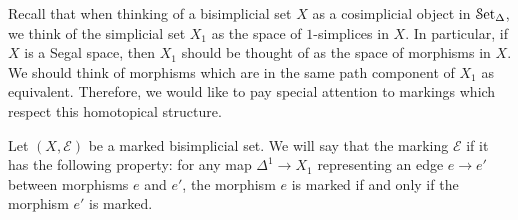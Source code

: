 \documentclass[main.tex]{subfiles}
\begin{document}
Recall that when thinking of a bisimplicial set $X$ as a cosimplicial object in $\mathcal{S}\mathrm{et}_{\Delta}$, we think of the simplicial set $X_{1}$ as the space of $1$-simplices in $X$. In particular, if $X$ is a Segal space, then $X_{1}$ should be thought of as the space of morphisms in $X$. We should think of morphisms which are in the same path component of $X_{1}$ as equivalent. Therefore, we would like to pay special attention to markings which respect this homotopical structure.
\begin{definition}
  \label{def:respects_path_components}
  Let $(X, \mathcal{E})$ be a marked bisimplicial set. We will say that the marking $\mathcal{E}$  if it has the following property: for any map $\Delta^{1} \to X_{1}$ representing an edge $e \to e'$ between morphisms $e$ and $e'$, the morphism $e$ is marked if and only if the morphism $e'$ is marked.
\end{definition}
\end{document}
